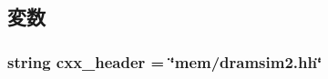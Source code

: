\subsection{変数}
\hypertarget{classDRAMSim2_1_1DRAMSim2_a17da7064bc5c518791f0c891eff05fda}{
\subsubsection[{cxx\_\-header}]{\setlength{\rightskip}{0pt plus 5cm}string {\bf cxx\_\-header} = \char`\"{}mem/dramsim2.hh\char`\"{}}}
\label{classDRAMSim2_1_1DRAMSim2_a17da7064bc5c518791f0c891eff05fda}


